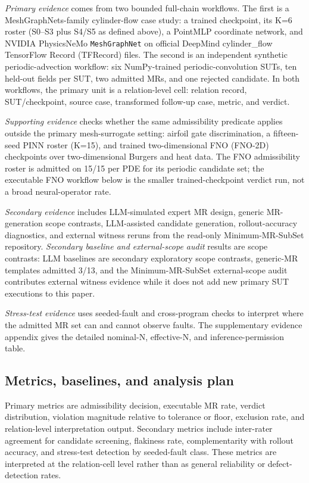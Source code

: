 \documentclass[preprint,12pt]{elsarticle}
\begin{document}
\emph{Primary evidence} comes from two bounded full-chain workflows. The first is a MeshGraphNets-family cylinder-flow case study: a trained checkpoint, its K=6 roster (S0--S3 plus S4/S5 as defined above), a PointMLP coordinate network, and NVIDIA PhysicsNeMo \texttt{MeshGraphNet} on official DeepMind cylinder\_flow TensorFlow Record (TFRecord) files. The second is an independent synthetic periodic-advection workflow: six NumPy-trained periodic-convolution SUTs, ten held-out fields per SUT, two admitted MRs, and one rejected candidate. In both workflows, the primary unit is a relation-level cell: relation record, SUT/checkpoint, source case, transformed follow-up case, metric, and verdict.

\emph{Supporting evidence} checks whether the same admissibility predicate applies outside the primary mesh-surrogate setting: airfoil gate discrimination, a fifteen-seed PINN roster (K=15), and trained two-dimensional FNO (FNO-2D) checkpoints over two-dimensional Burgers and heat data. The FNO admissibility roster is admitted on 15/15 per PDE for its periodic candidate set; the executable FNO workflow below is the smaller trained-checkpoint verdict run, not a broad neural-operator rate.

\emph{Secondary evidence} includes LLM-simulated expert MR design, generic MR-generation scope contrasts, LLM-assisted candidate generation, rollout-accuracy diagnostics, and external witness reruns from the read-only Minimum-MR-SubSet repository. \emph{Secondary baseline and external-scope audit} results are scope contrasts: LLM baselines are secondary exploratory scope contrasts, generic-MR templates admitted 3/13, and the Minimum-MR-SubSet external-scope audit contributes external witness evidence while it does not add new primary SUT executions to this paper.

\emph{Stress-test evidence} uses seeded-fault and cross-program checks to interpret where the admitted MR set can and cannot observe faults. The supplementary evidence appendix gives the detailed nominal-N, effective-N, and inference-permission table.

\subsection{Metrics, baselines, and analysis plan}
\label{subsec:metrics}
\label{subsec:experimental-method}
\label{subsec:baselines}
\label{subsec:rq-evidence}

Primary metrics are admissibility decision, executable MR rate, verdict distribution, violation magnitude relative to tolerance or floor, exclusion rate, and relation-level interpretation output. Secondary metrics include inter-rater agreement for candidate screening, flakiness rate, complementarity with rollout accuracy, and stress-test detection by seeded-fault class. These metrics are interpreted at the relation-cell level rather than as general reliability or defect-detection rates.
\end{document}
